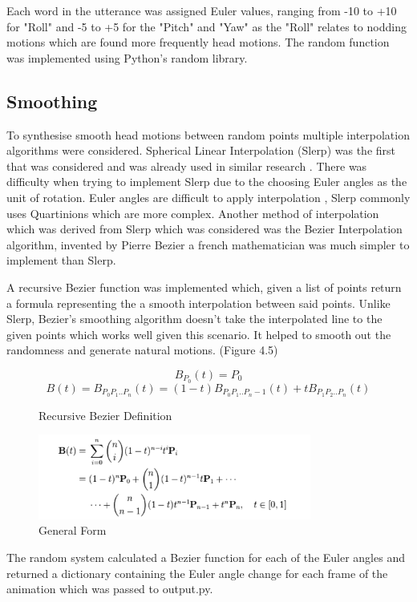 \documentclass[bsc,frontabs,twoside,singlespacing,parskip]{infthesis}
\begin{document}
Each word in the utterance was assigned Euler values, ranging from -10 to +10 for "Roll" and -5 to +5 for the "Pitch" and "Yaw" as the "Roll" relates to nodding motions which are found more frequently head motions. The random function was implemented using Python's random library.

\subsection{Smoothing}

To synthesise smooth head motions between random points multiple interpolation algorithms were considered. Spherical Linear Interpolation (Slerp) was the first that was considered and was already used in similar research \cite{rigid_head_motion}. There was difficulty when trying to implement Slerp due to the choosing Euler angles as the unit of rotation. Euler angles are difficult to apply interpolation \cite{quartionions}, Slerp commonly uses Quartinions which are more complex. Another method of interpolation which was derived from Slerp which was considered was the Bezier Interpolation algorithm, invented by Pierre Bezier a french mathematician was much simpler to implement than Slerp.

A recursive Bezier function was implemented which, given a list of points return a formula representing the a smooth interpolation between said points. Unlike Slerp, Bezier's smoothing algorithm doesn't take the interpolated line to the given points which works well given this scenario. It helped to smooth out the randomness and generate natural motions. (Figure 4.5)

\begin{figure}
	$$ B_{P_0}(t) = P_0 $$
	$$ B(t) = B_{P_0P_1..P_n}(t) = (1-t) B_{P_0P_1..P_n-1}(t) + tB_{P_1P_2..P_n} (t)$$
	\caption{Recursive Bezier Definition} 
	\centering
	\includegraphics[width=0.8\textwidth]{bezier_general.png}
	\caption{General Form}
\end{figure}

The random system calculated a Bezier function for each of the Euler angles and returned a dictionary containing the Euler angle change for each frame of the animation which was passed to output.py.
\end{document}
